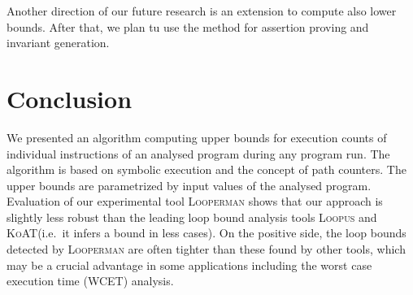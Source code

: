 \documentclass[10pt,a4paper]{article}
\newcommand{\Looperman}{\textsc{Looperman}\xspace}
\newcommand{\Loopus}{\textsc{Loopus}\xspace}
\newcommand{\KoAT}{\textsc{KoAT}\xspace}
\begin{document}
Another direction of our future research is an extension to compute 
also lower bounds. After that, we plan tu use the method for assertion proving
and invariant generation.



\section{Conclusion}\label{sec:concl}

We presented an algorithm computing upper bounds for execution counts of
individual instructions of an analysed program during any program run.  The
algorithm is based on symbolic execution and the concept of path
counters. The upper bounds are parametrized by input values of the analysed
program.
Evaluation of our experimental tool
\Looperman shows that our approach is slightly less robust than the leading loop
bound analysis tools \Loopus and \KoAT (i.e.~it infers a bound in less
cases). On the positive side, the loop bounds detected by \Looperman
are often tighter than these found by other tools, which may be a
crucial advantage in some applications including the worst case
execution time (WCET) analysis.





\end{document}
